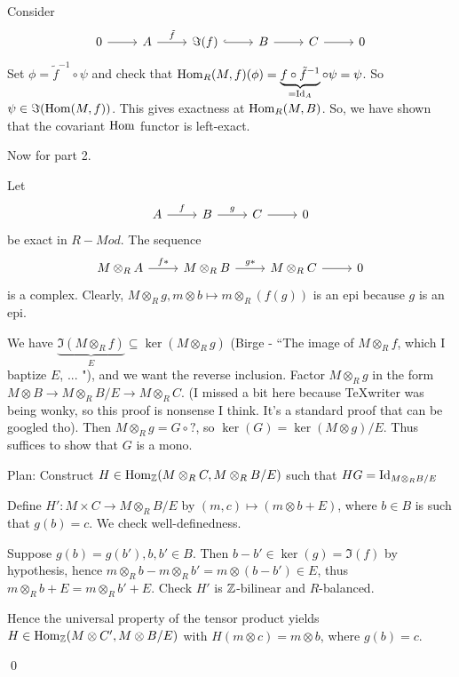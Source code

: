 \documentclass[x11names,reqno,14pt]{extarticle}
\begin{document}
Consider 
\[
\begin{tikzcd}
0\ar[r]&A\ar[r, "\tilde{f}"] & \Im(f) \ar[r, hook] & B \ar[r] & C \ar[r] & 0 
\end{tikzcd} 
\]
Set $\phi = \tilde{f}^{-1}\circ\psi$ and check that ${\mathrm{Hom}}_R(M, f)(\phi) = \underbrace{f \circ \tilde{f}^{-1}}_{=\operatorname{\mathrm{Id}}_A}\circ\psi = \psi$. So $\psi\in\Im({\mathrm{Hom}}(M, f))$. This gives exactness at ${\mathrm{Hom}}_R(M, B)$. So, we have shown that the covariant ${\mathrm{Hom}}$ functor is left-exact. 

Now for part 2. 

\dbend\dbend\dbend

Let 
\[
\begin{tikzcd}
A\ar[r, "f"] & B \ar[r, "g"] & C\ar[r] & 0 
\end{tikzcd}
\]
be exact in $R-Mod$. The sequence
\[
\begin{tikzcd}
M\otimes_RA\ar[r, "f*"] & M\otimes_RB \ar[r, "g*"] & M\otimes_RC\ar[r] & 0 
\end{tikzcd}
\]
is a complex. Clearly, $M\otimes_Rg, m\otimes b\mapsto m\otimes_R(f(g))$ is an epi because $g$ is an epi. 

We have $\underbrace{\Im(M\otimes_Rf)}_{E} \subseteq \ker(M\otimes_Rg)$ (Birge - ``The image of $M\otimes_Rf$, which I baptize $E$, ... "), and we want the reverse inclusion. Factor $M\otimes_R g$ in the form $M\otimes B \to M\otimes_R B/E \to M\otimes_R C$. (I missed a bit here because TeXwriter was being wonky, so this proof is nonsense I think. It's a standard proof that can be googled tho). Then $M \otimes_Rg = G \circ ?$, so $\ker(G) = \ker(M\otimes g)/E$. Thus suffices to show that $G$ is a mono. 

Plan: Construct $H\in{\mathrm{Hom}}_{\mathbb{Z}}(M\otimes_RC, M\otimes_RB/E)$ such that $HG = \operatorname{\mathrm{Id}}_{M\otimes_RB/E}$

Define $H':M\times C\to M\otimes_RB/E$ by $(m, c)\mapsto(m\otimes b + E)$, where $b \in B$ is such that $g(b) = c$. We check well-definedness. 

Suppose $g(b) = g(b'), b, b' \in B$. Then $b - b' \in \ker(g) = \Im(f)$ by hypothesis, hence $m\otimes_Rb - m\otimes_Rb' = m\otimes(b - b') \in E$, thus $m\otimes_Rb + E = m\otimes_Rb' + E$. Check $H'$ is $\mathbb{Z}$-bilinear and $R$-balanced. 

Hence the universal property of the tensor product yields $H \in {\mathrm{Hom}}_{\mathbb{Z}}(M\otimes C', M\otimes B/E)$ with $H(m\otimes c) = m\otimes b$, where $g(b) = c$. 

\qed

\exm
\end{document}
